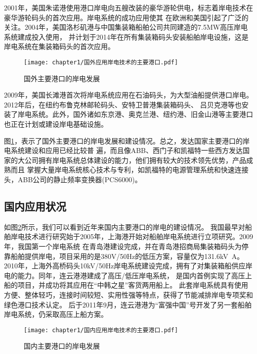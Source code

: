 2001年，美国朱诺港使用港口岸电向五艘改装的豪华游轮供电，标志着岸电技术在豪华游轮码头的首次应用。岸电系统的成功应用使其
在欧洲和美国引起了广泛的关注。2004年，美国洛杉矶港与中国集装箱船舶公司共同建造的7.5\si{MW}高压岸电系统建成投入使用\cite{SP5}，
并计划于2014年在所有集装箱码头安装船舶岸电设施，这是岸电系统在集装箱码头的首次应用。

\begin{figure}[!htp]
	\centering
	\texttt{[image: chapter1/国外应用岸电技术的主要港口.pdf]}
	\caption{国外主要港口的岸电发展}
	\label{fig:国外主要港口的岸电发展}
\end{figure}

2009年，美国长滩港首次将岸电系统应用在石油码头，为大型油船提供港口岸电。2012年后，在纽约布鲁克林邮轮码头、安特卫普港集装箱码头、
吕贝克港等也安装了岸电系统。此外，国外诸如东京港、奥克兰港、纽约港、旧金山港等主要港口也正在计划或建设岸电基础设施\cite{SP6}。

图\ref{fig:国外主要港口的岸电发展}，表示了国外主要港口的岸电发展和建设情况。总之，发达国家主要港口的岸电系统建设和应用已经比较普
遍，而且像ABB、西门子和凯福特一些西方发达国家的大公司拥有岸电系统总体建设的能力，他们拥有较大的技术领先优势，产品成熟而且
掌握大量岸电系统核心技术与专利，如凯福特的电源管理系统和快速连接头，ABB公司的静止频率变换器(PCS6000)\cite{SP5}。

\subsection{国内应用状况}

如图\ref{fig:国内主要港口的岸电发展}所示，我们可以看到近年来国内主要港口的岸电的建设情况。
我国最早对船舶岸电技术进行研究始于2005年，上海港开始对船舶岸电系统进行立项研究。2009年，我国第一个岸电系统
在青岛港建设完成，并在青岛港招商局集装箱码头为停靠船舶提供岸电，项目采用的是380V/50Hz的低压方案，容量仅为131.6\si{kV.A}。
2010年，上海外高桥码头10kV/50Hz岸电系统建设完成，拥有了对集装箱船供应岸电的能力。同年，连云港港建成了高压/低压岸电系统，
是国内首例实现了高压上船的项目，并成功将其应用在“中韩之星”客货两用船上\cite{SP4}。
此套岸电系统具有使用方便、整体轻巧，连接时间较短、实用性强等特点，获得了节能减排岸电专项奖和绿色港口技术认定\cite{SP8}。
后于2011年9月，连云港港为“富强中国”号开发了另一套船舶岸电系统，仍采取高压上船方案。

\begin{figure}[!htp]
	\centering
	\texttt{[image: chapter1/国内应用岸电技术的主要港口.pdf]}
	\caption{国内主要港口的岸电发展}
	\label{fig:国内主要港口的岸电发展}
\end{figure}

